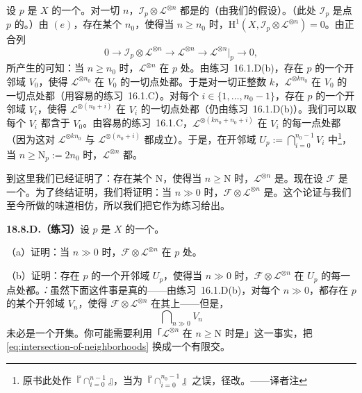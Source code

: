 设 $p$ 是 $X$ 的一个\trClosedPoint。对一切 $n$，$\mathscr{I}_p\otimes\mathscr{L}^{\otimes n}$ 都是\trCoh{}的（由我们的\trNoetherian{}假设）。（此处 $\mathscr{I}_p$ 是点 $p$ 的\trIdealSheaf。）由 $(e)$，存在某个 $n_0$，使得当 $n\ge n_0$ 时，$\mathrm{H}^1(X,\mathscr{I}_p\otimes\mathscr{L}^{\otimes n})=0$。由\trClosedSubscheme{}正合列
\[
0\longrightarrow\mathscr{I}_p\otimes\mathscr{L}^{\otimes n}\longrightarrow\mathscr{L}^{\otimes n}\longrightarrow\mathscr{L}^{\otimes n}|_p\longrightarrow 0,
\]
所产生的\trLongExactSequence{}可知：当 $n\ge n_0$ 时，$\mathscr{L}^{\otimes n}$ 在 $p$ 处\trGloballyGenerated。由\mbox{练习~16.1.D(b)}，存在 $p$ 的一个开邻域 $V_0$，使得 $\mathscr{L}^{\otimes n_0}$ 在 $V_0$ 的一切点处都\trGloballyGenerated。于是对一切正整数 $k$，$\mathscr{L}^{\otimes kn_0}$ 在 $V_0$ 的一切点处都\trGloballyGenerated（用\mbox{容易的练习~16.1.C}）。对每个 $i\in\{1,\dots,n_0-1\}$，存在 $p$ 的一个开邻域 $V_i$，使得 $\mathscr{L}^{\otimes(n_0+i)}$ 在 $V_i$ 的一切点处都\trGloballyGenerated（仍由\mbox{练习~16.1.D(b)}）。我们可以取每个 $V_i$ 都含于 $V_0$。由\mbox{容易的练习~16.1.C}，$\mathscr{L}^{\otimes(kn_0+n_0+i)}$ 在 $V_i$ 的每一点处都\trGloballyGenerated（因为这对 $\mathscr{L}^{\otimes kn_0}$ 与 $\mathscr{L}^{\otimes(n_0+i)}$ 都成立）。于是，在开邻域 $U_p:=\bigcap_{i=0}^{n_0-1}V_i$ 中\footnote{原书此处作『$\cap_{i=0}^{n-1}$』，当为『$\cap_{i=0}^{n_0-1}$』之误，径改。——译者注}，当 $n\ge\mathrm{N}_p:=2n_0$ 时，$\mathscr{L}^{\otimes n}$ 都\trGloballyGenerated。

到这里我们已经证明了：存在某个 $\mathrm{N}$，使得当 $n\ge\mathrm{N}$ 时，$\mathscr{L}^{\otimes n}$ 是\trGloballyGenerated。现在设 $\mathscr{F}$ 是一个\trCoherentSheaf。为了终结证明，我们将证明：当 $n\gg 0$ 时，$\mathscr{F}\otimes\mathscr{L}^{\otimes n}$ 是\trGloballyGenerated。这个论证与我们至今所做的味道相仿，所以我们把它作为练习给出。

\textbf{18.8.D.（练习）}\quad 设 $p$ 是 $X$ 的一个\trClosedPoint。

（a）证明：当 $n\gg 0$ 时，$\mathscr{F}\otimes\mathscr{L}^{\otimes n}$ 在 $p$ 处\trGloballyGenerated。

（b）证明：存在 $p$ 的一个开邻域 $U_p$，使得当 $n\gg 0$ 时，$\mathscr{F}\otimes\mathscr{L}^{\otimes n}$ 在 $U_p$ 的每一点处都\trGloballyGenerated。\emph{\trhCaveat：}虽然下面这件事是真的——由\mbox{练习~16.1.D(b)}，对每个 $n\gg 0$，都存在 $p$ 的某个开邻域 $V_n$，使得 $\mathscr{F}\otimes\mathscr{L}^{\otimes n}$ 在其上\trGloballyGenerated——但是，
\begin{equation*}\tag{18.8.3.1}\label{eq:intersection-of-neighborhoods}
\bigcap\nolimits_{n\gg 0}V_n
\end{equation*}
未必是一个开集。你可能需要利用「$\mathscr{L}^{\otimes n}$ 在 $n\ge\mathrm{N}$ 时是\trGloballyGenerated」这一事实，把 \eqref{eq:intersection-of-neighborhoods} 换成一个有限交。

